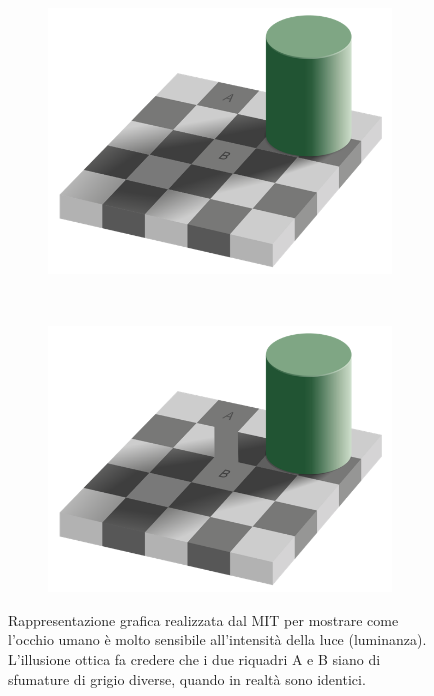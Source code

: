 
\begin{figure}[htbp]
	\centering
	
	\begin{subfigure}[t]{0.45\textwidth}
		\centering
		\includegraphics[width=\textwidth]{res/mit1.png}
	\end{subfigure}%
	~ 
	\begin{subfigure}[t]{0.45\textwidth}
		\centering
		\includegraphics[width=\textwidth]{res/mit2.png}
	\end{subfigure}
	
	\caption{Rappresentazione grafica realizzata dal MIT\protect\footnotemark{} per mostrare come l'occhio umano è molto sensibile all'intensità della luce (luminanza). L'illusione ottica fa credere che i due riquadri A e B siano di sfumature di grigio diverse, quando in realtà sono identici.}
	\label{fig:diff_mit}
\end{figure}

